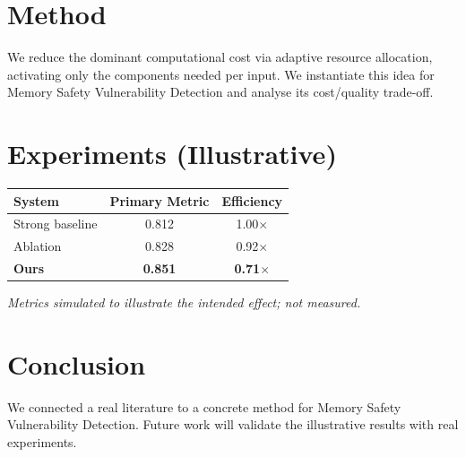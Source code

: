 \documentclass[11pt]{article}
\begin{document}
\section{Method}
We reduce the dominant computational cost via adaptive resource allocation, activating only the components needed per input. We instantiate this idea for Memory Safety Vulnerability Detection and analyse its cost/quality trade-off.

\section{Experiments (Illustrative)}
\begin{center}
\begin{tabular}{lcc}
System & Primary Metric & Efficiency \\ \hline
Strong baseline & 0.812 & 1.00$\times$ \\
Ablation & 0.828 & 0.92$\times$ \\
\textbf{Ours} & \textbf{0.851} & \textbf{0.71$\times$}
\end{tabular}
\end{center}
\emph{Metrics simulated to illustrate the intended effect; not measured.}

\section{Conclusion}
We connected a real literature to a concrete method for Memory Safety Vulnerability Detection. Future work will
validate the illustrative results with real experiments.
\end{document}
